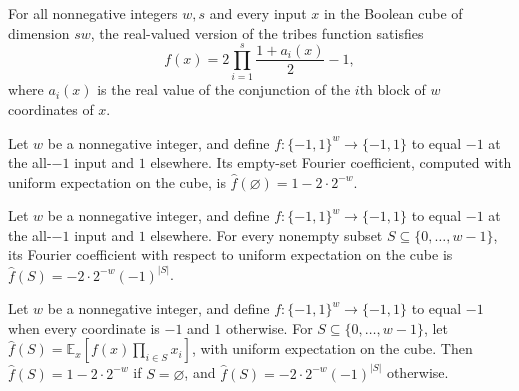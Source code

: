 \begin{theorem}
\label{FABL.tribes_toReal_eq}
\leanok
{}
For all nonnegative integers $w,s$ and every input $x$ in the Boolean cube of dimension
$sw$, the real-valued version of the tribes function satisfies
\[
 f(x)=2\prod_{i=1}^{s}\frac{1+a_i(x)}{2}-1,
\]
where $a_i(x)$ is the real value of the conjunction of the $i$th block of $w$
coordinates of $x$.
\end{theorem}

\begin{theorem}
\label{FABL.fourierCoeff_andFunction_empty}
\leanok
{}
Let $w$ be a nonnegative integer, and define $f:\{-1,1\}^w\to\{-1,1\}$ to equal $-1$ at
the all-$-1$ input and $1$ elsewhere. Its empty-set Fourier coefficient, computed with
uniform expectation on the cube, is $\widehat f(\varnothing)=1-2\cdot 2^{-w}$.
\end{theorem}

\begin{theorem}
\label{FABL.fourierCoeff_andFunction_of_ne_empty}
\leanok
{}
Let $w$ be a nonnegative integer, and define $f:\{-1,1\}^w\to\{-1,1\}$ to equal $-1$ at
the all-$-1$ input and $1$ elsewhere. For every nonempty subset
$S\subseteq\{0,\ldots,w-1\}$, its Fourier coefficient with respect to uniform
expectation on the cube is $\widehat f(S)=-2\cdot 2^{-w}(-1)^{|S|}$.
\end{theorem}

\begin{theorem}
\label{FABL.fourierCoeff_andFunction}
\leanok
{}
Let $w$ be a nonnegative integer, and define $f:\{-1,1\}^w\to\{-1,1\}$ to equal $-1$
when every coordinate is $-1$ and $1$ otherwise. For $S\subseteq\{0,\ldots,w-1\}$, let
$\widehat f(S)=\mathbb E_x[f(x)\prod_{i\in S}x_i]$, with uniform expectation on the
cube. Then $\widehat f(S)=1-2\cdot 2^{-w}$ if $S=\varnothing$, and $\widehat
f(S)=-2\cdot 2^{-w}(-1)^{|S|}$ otherwise.
\end{theorem}

